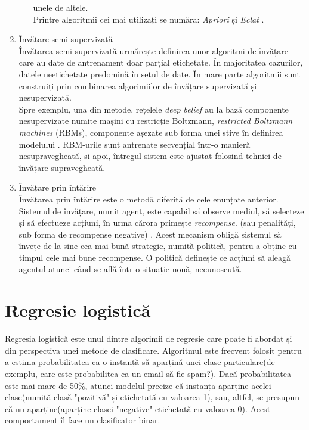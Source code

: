 \documentclass[a4paper,12pt]{report}
\begin{document}
\begin{enumerate}
\begin{enumerate}
        unele de altele. \\
        Printre algoritmii cei mai utilizați se numără: \emph{Apriori} și \emph{Eclat} \cite{Hands-On-Machine-Learning}. 
    \end{enumerate}
    \item Învățare semi-supervizată \\
    Învățarea semi-supervizată urmărește definirea unor algoritmi de învățare care au date de antrenament
    doar parțial etichetate. În majoritatea cazurilor, datele neetichetate predomină în setul de date.
    În mare parte algoritmii sunt construiți prin combinarea algorimiilor de învățare supervizată și
    nesupervizată. \\ 
    Spre exemplu, una din metode, rețelele \emph{deep belief} au la bază componente nesupervizate
    numite mașini cu restricție Boltzmann, \emph{restricted Boltzmann machines} (RBMs), componente așezate sub
    forma unei stive în definirea modelului \cite{Hands-On-Machine-Learning}. RBM-urile sunt antrenate secvențial într-o manieră nesupravegheată,
    și apoi, întregul sistem este ajustat folosind tehnici de învățare supravegheată.
    \item Învățare prin întărire \\
    Învățarea prin întărire este o metodă diferită de cele enunțate anterior. Sistemul de învățare, numit agent,
    este capabil să observe mediul, să selecteze și să efectueze acțiuni, în urma cărora primește \emph{recompense}.
    (sau penalități, sub forma de recompense negative) \cite{Hands-On-Machine-Learning}.
    Acest mecanism obligă sistemul să învețe de la sine cea mai bună strategie, numită politică, pentru a obține cu timpul cele mai bune recompense. O politică
    definește ce acțiuni să aleagă agentul atunci când se află într-o situație nouă, necunoscută.
\end{enumerate}
\iffalse
\section{Regresie logistică}
    Regresia logistică este unul dintre algorimii de regresie care poate fi abordat și din  
    perspectiva unei metode de clasificare. Algoritmul este frecvent folosit pentru a estima probabilitatea
    ca o instanță să aparțină unei clase particulare(de exemplu, care este probabilitea ca un email
    să fie spam?). Dacă probabilitatea este mai mare de 50\%, atunci modelul precize că instanța aparține
    acelei clase(numită clasă "pozitivă" și etichetată cu valoarea 1), sau, altfel, se presupun că
    nu aparține(aparține clasei "negative" etichetată cu valoarea 0). Acest comportament îl face 
    un clasificator binar.
\end{document}
